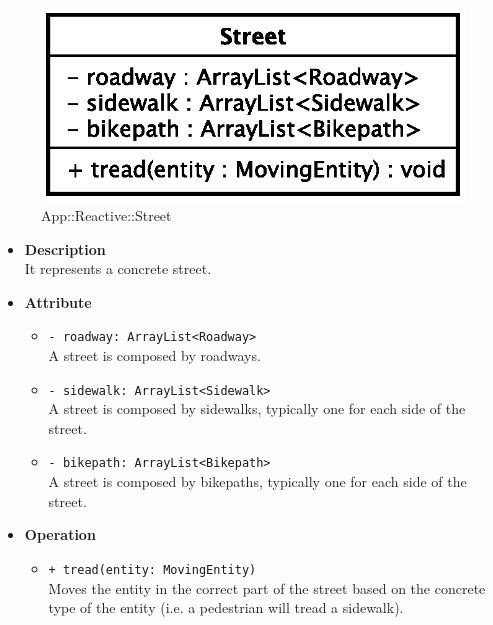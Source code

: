 \begin{figure}[h]
\centering
\includegraphics[scale=0.6,keepaspectratio]{images/solution/street.eps}
\caption{App::Reactive::Street}
\label{fig:sd-app-street}
\end{figure}
\FloatBarrier
\begin{itemize}
  \item \textbf{Description} \\
    It represents a concrete street.
  \item \textbf{Attribute}
  \begin{itemize}
    \item \texttt{- roadway: ArrayList<Roadway>} \\
A street is composed by roadways.
    \item \texttt{- sidewalk: ArrayList<Sidewalk>} \\
A street is composed by sidewalks, typically one for each side
of the street.
    \item \texttt{- bikepath: ArrayList<Bikepath>} \\
A street is composed by bikepaths, typically one for each side
of the street.
  \end{itemize}
  \item \textbf{Operation}
  \begin{itemize} 
    \item \texttt{+ tread(entity: MovingEntity)} \\
Moves the entity in the correct part of the street based on the 
concrete type of the entity (i.e. a pedestrian will tread a sidewalk).
  \end{itemize}
\end{itemize}
